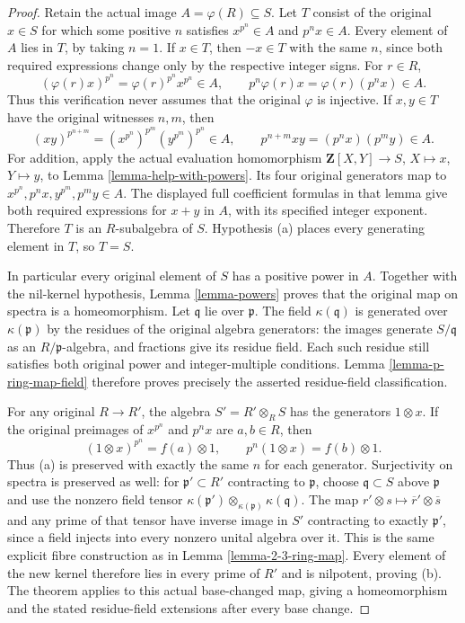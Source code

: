 \begin{proof}
Retain the actual image $A=\varphi(R)\subseteq S$.
Let $T$ consist of the original $x\in S$ for
which some positive $n$ satisfies
$x^{p^n}\in A$ and $p^n x\in A$.
Every element of $A$ lies in $T$, by taking
$n=1$. If $x\in T$, then $-x\in T$ with
the same $n$, since both required expressions
change only by the respective integer signs.
For $r\in R$,
$$
(\varphi(r)x)^{p^n}=\varphi(r)^{p^n}x^{p^n}\in A,
\qquad
p^n\varphi(r)x=\varphi(r)(p^n x)\in A.
$$
Thus this verification never assumes that
the original $\varphi$ is injective.
If $x,y\in T$ have the original witnesses
$n,m$, then
$$
(xy)^{p^{n+m}}
=(x^{p^n})^{p^m}(y^{p^m})^{p^n}\in A,
\qquad
p^{n+m}xy=(p^n x)(p^m y)\in A.
$$
For addition, apply the actual evaluation
homomorphism $\mathbf Z[X,Y]\to S$,
$X\mapsto x$, $Y\mapsto y$, to Lemma
\ref{lemma-help-with-powers}. Its four
original generators map to
$x^{p^n},p^n x,y^{p^m},p^m y\in A$.
The displayed full coefficient formulas
in that lemma give both required expressions
for $x+y$ in $A$, with its specified
integer exponent. Therefore $T$ is an
$R$-subalgebra of $S$. Hypothesis (a)
places every generating element in $T$,
so $T=S$.

In particular every original element
of $S$ has a positive power in $A$.
Together with the nil-kernel hypothesis,
Lemma \ref{lemma-powers} proves that
the original map on spectra is a
homeomorphism. Let $\mathfrak q$ lie
over $\mathfrak p$. The field
$\kappa(\mathfrak q)$ is generated over
$\kappa(\mathfrak p)$ by the residues
of the original algebra generators:
the images generate $S/\mathfrak q$
as an $R/\mathfrak p$-algebra, and
fractions give its residue field.
Each such residue still satisfies
both original power and integer-multiple
conditions. Lemma \ref{lemma-p-ring-map-field}
therefore proves precisely the asserted
residue-field classification.

For any original $R\to R'$, the
algebra $S'=R'\otimes_R S$ has the
generators $1\otimes x$. If the
original preimages of $x^{p^n}$ and
$p^n x$ are $a,b\in R$, then
$$
(1\otimes x)^{p^n}=f(a)\otimes1,
\qquad p^n(1\otimes x)=f(b)\otimes1.
$$
Thus (a) is preserved with exactly
the same $n$ for each generator.
Surjectivity on spectra is preserved
as well: for $\mathfrak p'\subset R'$
contracting to $\mathfrak p$, choose
$\mathfrak q\subset S$ above
$\mathfrak p$ and use the nonzero
field tensor
$\kappa(\mathfrak p')\otimes_{\kappa(\mathfrak p)}\kappa(\mathfrak q)$.
The map $r'\otimes s\mapsto
\overline r'\otimes\overline s$
and any prime of that tensor have
inverse image in $S'$ contracting
to exactly $\mathfrak p'$, since
a field injects into every nonzero
unital algebra over it. This is
the same explicit fibre construction
as in Lemma \ref{lemma-2-3-ring-map}.
Every element of the new kernel
therefore lies in every prime of
$R'$ and is nilpotent, proving (b).
The theorem applies to this actual
base-changed map, giving a
homeomorphism and the stated
residue-field extensions after
every base change.


\end{proof}
